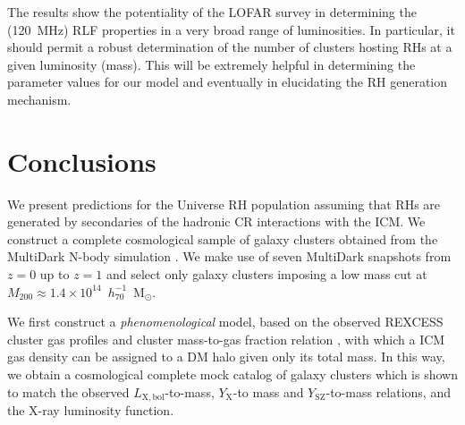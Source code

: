 \documentclass[traditabstract]{aa}
\newcommand{\rmn}{\mathrm}
\begin{document}
The results show the potentiality of the LOFAR survey in determining the (120~MHz) RLF properties in a very broad range of luminosities. In particular, it should permit a robust determination of the number of clusters hosting RHs at a given luminosity (mass). This will be extremely helpful in determining the parameter values for our model and eventually in elucidating the RH generation mechanism.


\section{Conclusions}
\label{sec:6}
We present predictions for the Universe RH population assuming that RHs are generated by secondaries of the hadronic CR interactions with the ICM. We construct a complete cosmological sample of galaxy clusters obtained from the MultiDark N-body simulation \citep{2011arXiv1104.5130P}. We make use of seven MultiDark snapshots from $z = 0$ up to $z = 1$ and select only galaxy clusters imposing a low mass cut at $M_{200}\approx1.4\times10^{14}$~$h_{70}^{-1}$~M$_{\odot}$. 

We first construct a \emph{phenomenological} model, based on the observed REXCESS cluster gas profiles \citep{2008A&A...487..431C} and cluster mass-to-gas fraction relation \citep{2009ApJ...693.1142S}, with which a ICM gas density can be assigned to a DM halo given only its total mass. 
In this way, we obtain a cosmological complete mock catalog of galaxy clusters which is shown to match the observed $L_{\rmn{X, bol}}$-to-mass, $Y_{\rmn{X}}$-to mass and $Y_{\rmn{SZ}}$-to-mass relations, and the X-ray luminosity function.
\end{document}
